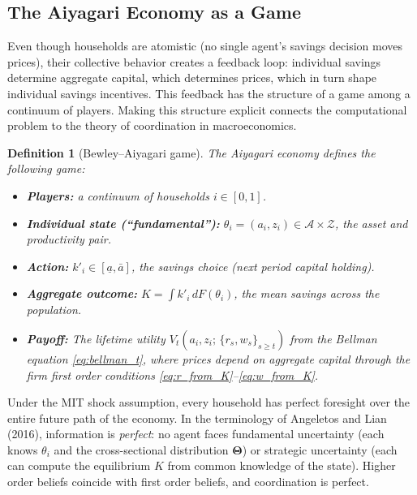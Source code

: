 \documentclass[12pt]{article}
\newtheorem{definition}{Definition}
\begin{document}
\subsection{The Aiyagari Economy as a Game}
\label{ssec:aiyagari_game}

Even though households are atomistic (no single agent's savings decision moves prices), their collective behavior creates a feedback loop: individual savings determine aggregate capital, which determines prices, which in turn shape individual savings incentives. This feedback has the structure of a game among a continuum of players. Making this structure explicit connects the computational problem to the theory of coordination in macroeconomics.

\begin{definition}[Bewley--Aiyagari game]
\label{def:aiyagari_game}
The Aiyagari economy defines the following game:
\begin{itemize}[nosep]
    \item \textbf{Players:} a continuum of households $i \in [0,1]$.
    \item \textbf{Individual state (``fundamental''):} $\theta_i = (a_i, z_i) \in \mathcal{A} \times \mathcal{Z}$, the asset and productivity pair.
    \item \textbf{Action:} $k'_i \in [\underline{a}, \bar{a}]$, the savings choice (next period capital holding).
    \item \textbf{Aggregate outcome:} $K = \int k'_i \, dF(\theta_i)$, the mean savings across the population.
    \item \textbf{Payoff:} The lifetime utility $V_t(a_i, z_i;\, \{r_s, w_s\}_{s \geq t})$ from the Bellman equation \eqref{eq:bellman_t}, where prices depend on aggregate capital through the firm first order conditions \eqref{eq:r_from_K}--\eqref{eq:w_from_K}.
\end{itemize}
\end{definition}

\noindent Under the MIT shock assumption, every household has perfect foresight over the entire future path of the economy. In the terminology of Angeletos and Lian (2016), information is \emph{perfect}: no agent faces fundamental uncertainty (each knows $\theta_i$ and the cross-sectional distribution $\boldsymbol{\Theta}$) or strategic uncertainty (each can compute the equilibrium $K$ from common knowledge of the state). Higher order beliefs coincide with first order beliefs, and coordination is perfect.
\end{document}
